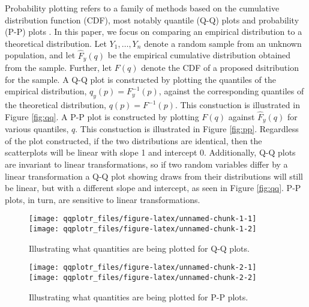 Probability plotting refers to a family of methods based on the
cumulative distribution function (CDF), most notably quantile (Q-Q)
plots and probability (P-P) plots \citep{Wilk1968-ii}. In this paper, we
focus on comparing an empirical distribution to a theoretical
distribution. Let \(Y_1, \ldots, Y_n\) denote a random sample from an
unknown population, and let \(\widehat{F}_y(q)\) be the empirical
cumulative distribution obtained from the sample. Further, let \(F(q)\)
denote the CDF of a proposed dsitribution for the sample. A Q-Q plot is
constructed by plotting the quantiles of the empirical distribution,
\(q_y(p) = F_y^{-1}(p)\), against the corresponding quantiles of the
theoretical distribution, \(q(p) = F^{-1}(p)\). This constuction is
illustrated in Figure \ref{fig:qq}. A P-P plot is constructed by
plotting \(F(q)\) against \(\widehat{F}_y(q)\) for various quantiles,
\(q\). This constuction is illustrated in Figure \ref{fig:pp}.
Regardless of the plot constructed, if the two distributions are
identical, then the scatterplots will be linear with slope 1 and
intercept 0. Additionally, Q-Q plots are invariant to linear
transformations, so if two random variables differ by a linear
transformation a Q-Q plot showing draws from their distributions will
still be linear, but with a different slope and intercept, as seen in
Figure \ref{fig:qq}. P-P plots, in turn, are sensitive to linear
transformations.

\begin{Schunk}
\begin{figure}

{\centering \texttt{[image: qqplotr\_files/figure-latex/unnamed-chunk-1-1]} \texttt{[image: qqplotr\_files/figure-latex/unnamed-chunk-1-2]} 

}

\caption{\label{fig:qq}Illustrating what quantities are being plotted for Q-Q plots.}\label{fig:unnamed-chunk-1}
\end{figure}
\end{Schunk}

\begin{Schunk}
\begin{figure}

{\centering \texttt{[image: qqplotr\_files/figure-latex/unnamed-chunk-2-1]} \texttt{[image: qqplotr\_files/figure-latex/unnamed-chunk-2-2]} 

}

\caption{\label{fig:pp}Illustrating what quantities are being plotted for P-P plots.}\label{fig:unnamed-chunk-2}
\end{figure}
\end{Schunk}

